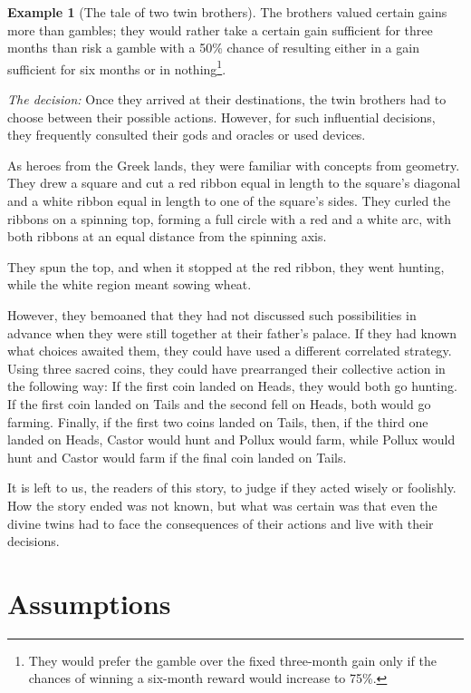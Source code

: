 \documentclass{article}
\theoremstyle{definition}
\newtheorem*{example}{Example}
\begin{document}
\begin{example}[The tale of two twin brothers]
The brothers valued certain gains more than gambles; they would rather take a certain gain sufficient for three months than risk a gamble with a 50\% chance of resulting either in a gain sufficient for six months or in nothing\footnote{They would prefer the gamble over the fixed three-month gain only if the chances of winning a six-month reward would increase to 75\%.}.

{\it The decision:}
Once they arrived at their destinations, the twin brothers had to choose between their possible actions. However, for such influential decisions, they frequently consulted their gods and oracles or used devices.

As heroes from the Greek lands, they were familiar with concepts from geometry. They drew a square and cut a red ribbon equal in length to the square's diagonal and a white ribbon equal in length to one of the square's sides.
They curled the ribbons on a spinning top, forming a full circle with a red and a white arc, with both ribbons at an equal distance from the spinning axis.

They spun the top, and when it stopped at the red ribbon, they went hunting, while the white region meant sowing wheat.

However, they bemoaned that they had not discussed such possibilities in advance when they were still together at their father's palace. If they had known what choices awaited them, they could have used a different correlated strategy. Using three sacred coins, they could have prearranged their collective action in the following way:
If the first coin landed on Heads, they would both go hunting. If the first coin landed on Tails and the second fell on Heads, both would go farming. Finally, if the first two coins landed on Tails, then, if the third one landed on Heads, Castor would hunt and Pollux would farm, while Pollux would hunt and Castor would farm if the final coin landed on Tails.

It is left to us, the readers of this story, to judge if they acted wisely or foolishly.
How the story ended was not known, but what was certain was that even the divine twins had to face the consequences of their actions and live with their decisions.

\end{example}

\section{Assumptions}
\end{document}
